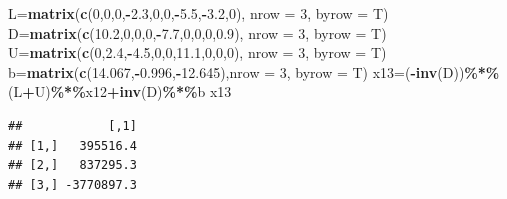 \documentclass[
]{article}
\newenvironment{Shaded}{\begin{snugshade}}{\end{snugshade}}
\newcommand{\AttributeTok}[1]{\textcolor[rgb]{0.13,0.29,0.53}{#1}}
\newcommand{\DecValTok}[1]{\textcolor[rgb]{0.00,0.00,0.81}{#1}}
\newcommand{\FloatTok}[1]{\textcolor[rgb]{0.00,0.00,0.81}{#1}}
\newcommand{\FunctionTok}[1]{\textcolor[rgb]{0.13,0.29,0.53}{\textbf{#1}}}
\newcommand{\NormalTok}[1]{#1}
\newcommand{\OtherTok}[1]{\textcolor[rgb]{0.56,0.35,0.01}{#1}}
\newcommand{\SpecialCharTok}[1]{\textcolor[rgb]{0.81,0.36,0.00}{\textbf{#1}}}
\begin{document}
\begin{Shaded}
\begin{Highlighting}[]
\NormalTok{  L}\OtherTok{=}\FunctionTok{matrix}\NormalTok{(}\FunctionTok{c}\NormalTok{(}\DecValTok{0}\NormalTok{,}\DecValTok{0}\NormalTok{,}\DecValTok{0}\NormalTok{,}\SpecialCharTok{{-}}\FloatTok{2.3}\NormalTok{,}\DecValTok{0}\NormalTok{,}\DecValTok{0}\NormalTok{,}\SpecialCharTok{{-}}\FloatTok{5.5}\NormalTok{,}\SpecialCharTok{{-}}\FloatTok{3.2}\NormalTok{,}\DecValTok{0}\NormalTok{), }\AttributeTok{nrow =} \DecValTok{3}\NormalTok{, }\AttributeTok{byrow =}\NormalTok{ T)}
\NormalTok{  D}\OtherTok{=}\FunctionTok{matrix}\NormalTok{(}\FunctionTok{c}\NormalTok{(}\FloatTok{10.2}\NormalTok{,}\DecValTok{0}\NormalTok{,}\DecValTok{0}\NormalTok{,}\DecValTok{0}\NormalTok{,}\SpecialCharTok{{-}}\FloatTok{7.7}\NormalTok{,}\DecValTok{0}\NormalTok{,}\DecValTok{0}\NormalTok{,}\DecValTok{0}\NormalTok{,}\FloatTok{0.9}\NormalTok{), }\AttributeTok{nrow =} \DecValTok{3}\NormalTok{, }\AttributeTok{byrow =}\NormalTok{ T)}
\NormalTok{  U}\OtherTok{=}\FunctionTok{matrix}\NormalTok{(}\FunctionTok{c}\NormalTok{(}\DecValTok{0}\NormalTok{,}\FloatTok{2.4}\NormalTok{,}\SpecialCharTok{{-}}\FloatTok{4.5}\NormalTok{,}\DecValTok{0}\NormalTok{,}\DecValTok{0}\NormalTok{,}\FloatTok{11.1}\NormalTok{,}\DecValTok{0}\NormalTok{,}\DecValTok{0}\NormalTok{,}\DecValTok{0}\NormalTok{), }\AttributeTok{nrow =} \DecValTok{3}\NormalTok{, }\AttributeTok{byrow =}\NormalTok{ T)}
\NormalTok{  b}\OtherTok{=}\FunctionTok{matrix}\NormalTok{(}\FunctionTok{c}\NormalTok{(}\FloatTok{14.067}\NormalTok{,}\SpecialCharTok{{-}}\FloatTok{0.996}\NormalTok{,}\SpecialCharTok{{-}}\FloatTok{12.645}\NormalTok{),}\AttributeTok{nrow =} \DecValTok{3}\NormalTok{, }\AttributeTok{byrow =}\NormalTok{ T)}
\NormalTok{  x13}\OtherTok{=}\NormalTok{(}\SpecialCharTok{{-}}\FunctionTok{inv}\NormalTok{(D))}\SpecialCharTok{\%*\%}\NormalTok{(L}\SpecialCharTok{+}\NormalTok{U)}\SpecialCharTok{\%*\%}\NormalTok{x12}\SpecialCharTok{+}\FunctionTok{inv}\NormalTok{(D)}\SpecialCharTok{\%*\%}\NormalTok{b}
\NormalTok{  x13}
\end{Highlighting}
\end{Shaded}

\begin{verbatim}
##            [,1]
## [1,]   395516.4
## [2,]   837295.3
## [3,] -3770897.3
\end{verbatim}
\end{document}
